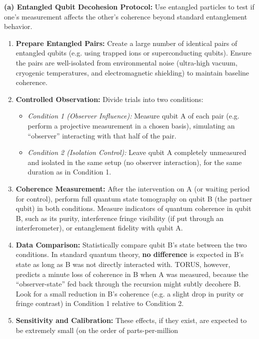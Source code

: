 \documentclass[]{article}
\begin{document}
{\textbf{(a) Entangled Qubit Decohesion Protocol:} Use entangled
particles to test if one's measurement affects the other's coherence
beyond standard entanglement behavior.

\begin{enumerate}
\def\labelenumi{\arabic{enumi}.}
\item
  \textbf{Prepare Entangled Pairs:} Create a large number of identical
  pairs of entangled qubits (e.g. using trapped ions or superconducting
  qubits). Ensure the pairs are well-isolated from environmental noise
  (ultra-high vacuum, cryogenic temperatures, and electromagnetic
  shielding) to maintain baseline coherence.
\item
  \textbf{Controlled Observation:} Divide trials into two conditions:

  \begin{itemize}
  \item
    \emph{Condition 1 (Observer Influence):} Measure qubit A of each
    pair (e.g. perform a projective measurement in a chosen basis),
    simulating an ``observer'' interacting with that half of the pair.
  \item
    \emph{Condition 2 (Isolation Control):} Leave qubit A completely
    unmeasured and isolated in the same setup (no observer interaction),
    for the same duration as in Condition 1.
  \end{itemize}
\item
  \textbf{Coherence Measurement:} After the intervention on A (or
  waiting period for control), perform full quantum state tomography on
  qubit B (the partner qubit) in both conditions. Measure indicators of
  quantum coherence in qubit B, such as its purity, interference fringe
  visibility (if put through an interferometer), or entanglement
  fidelity with qubit A.
\item
  \textbf{Data Comparison:} Statistically compare qubit B's state
  between the two conditions. In standard quantum theory, \textbf{no
  difference} is expected in B's state as long as B was not directly
  interacted with. TORUS, however, predicts a minute loss of coherence
  in B when A was measured, because the ``observer-state'' fed back
  through the recursion might subtly decohere B​. Look for a small
  reduction in B's coherence (e.g. a slight drop in purity or fringe
  contrast) in Condition 1 relative to Condition 2.
\item
  \textbf{Sensitivity and Calibration:} These effects, if they exist,
  are expected to be extremely small (on the order of parts-per-million

\end{enumerate}}
\end{document}
